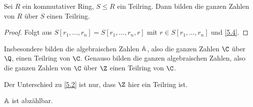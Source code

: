 \begin{kor} \label{5.5}
	Sei $R$ ein kommutativer Ring, $S \le R$ ein Teilring.
	Dann bilden die ganzen Zahlen von $R$ über $S$ einen Teilring.
	\begin{proof}
		Folgt aus $S[r_1, \dotsc, r_n] = S[r_1, \dotsc, r_n, r]$ mit $r \in S[r_1, \dotsc, r_n]$ und \ref{5.4}.
	\end{proof}
	\begin{note}
		Insbesondere bilden die algebraischen Zahlen $\mathbb{A}$, also die ganzen Zahlen $\C$ über $\Q$, einen Teilring von $\C$.
		Genauso bilden die ganzen algebraischen Zahlen, also die ganzen Zahlen von $\C$ über $\Z$ einen Teilring von $\C$.

		Der Unterschied zu \ref{5.2} ist nur, dass $\Z$ hier ein Teilring ist.

		$\mathbb{A}$ ist abzählbar.
	\end{note}
\end{kor}
